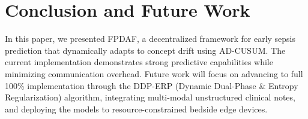 \documentclass[conference]{IEEEtran}
\begin{document}
\begin{table}[htbp]
\caption{Model Benchmarking Results}
\begin{center}
\end{center}
\end{table}

\section{Conclusion and Future Work}
In this paper, we presented FPDAF, a decentralized framework for early sepsis prediction that dynamically adapts to concept drift using AD-CUSUM. The current implementation demonstrates strong predictive capabilities while minimizing communication overhead. Future work will focus on advancing to full 100\% implementation through the DDP-ERP (Dynamic Dual-Phase \& Entropy Regularization) algorithm, integrating multi-modal unstructured clinical notes, and deploying the models to resource-constrained bedside edge devices.
\end{document}

